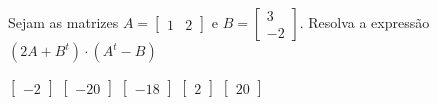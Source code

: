 Sejam as matrizes $A = \left[ \begin{array}{cc}
1 & 2
\end{array} \right]$ e $B = \left[ \begin{array}{c}
3 \\ -2
\end{array} \right]$. Resolva a expressão $\left( 2A+B^t \right)\cdot \left( A^t-B \right)$

$\left[ \begin{array}{c} -2 \end{array} \right]$
$\left[ \begin{array}{c} -20 \end{array} \right]$
$\left[ \begin{array}{c} -18 \end{array} \right]$
$\left[ \begin{array}{c} 2 \end{array} \right]$
$\left[ \begin{array}{c} 20 \end{array} \right]$


